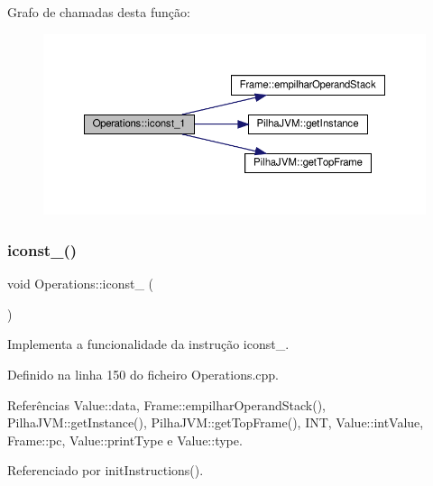 Grafo de chamadas desta função\+:\nopagebreak
\begin{figure}[H]
\begin{center}
\leavevmode
\includegraphics[width=350pt]{classOperations_a3933ba76ead633a53683ff8491a313ea_cgraph}
\end{center}
\end{figure}
\mbox{\label{classOperations_af1a4f99f0d99da0a7db7fc926932a3c8}} 
\subsubsection{\texorpdfstring{iconst\+\_()}{iconst\_2()}}
{\footnotesize\ttfamily void Operations\+::iconst\+\_ (\begin{DoxyParamCaption}{ }\end{DoxyParamCaption})\hspace{0.3cm}{\ttfamily [private]}}



Implementa a funcionalidade da instrução iconst\+\_. 



Definido na linha 150 do ficheiro Operations.\+cpp.



Referências Value\+::data, Frame\+::empilhar\+Operand\+Stack(), Pilha\+J\+V\+M\+::get\+Instance(), Pilha\+J\+V\+M\+::get\+Top\+Frame(), I\+NT, Value\+::int\+Value, Frame\+::pc, Value\+::print\+Type e Value\+::type.



Referenciado por init\+Instructions().

